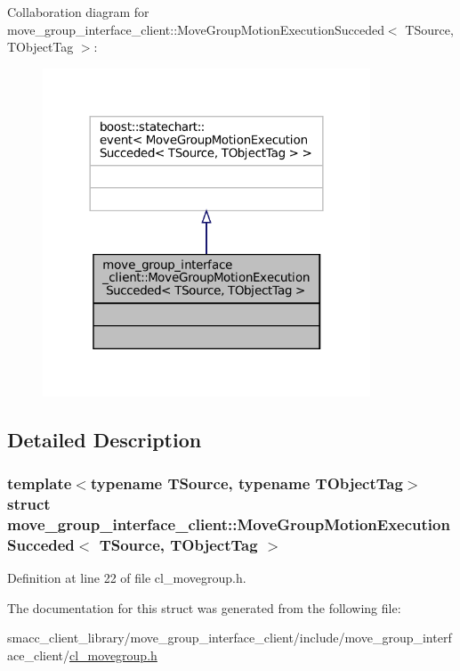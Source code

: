 Collaboration diagram for move\+\_\+group\+\_\+interface\+\_\+client\+:\+:Move\+Group\+Motion\+Execution\+Succeded$<$ T\+Source, T\+Object\+Tag $>$\+:
\nopagebreak
\begin{figure}[H]
\begin{center}
\leavevmode
\includegraphics[width=276pt]{structmove__group__interface__client_1_1MoveGroupMotionExecutionSucceded__coll__graph}
\end{center}
\end{figure}


\subsection{Detailed Description}
\subsubsection*{template$<$typename T\+Source, typename T\+Object\+Tag$>$\newline
struct move\+\_\+group\+\_\+interface\+\_\+client\+::\+Move\+Group\+Motion\+Execution\+Succeded$<$ T\+Source, T\+Object\+Tag $>$}



Definition at line 22 of file cl\+\_\+movegroup.\+h.



The documentation for this struct was generated from the following file\+:\begin{DoxyCompactItemize}
\item 
smacc\+\_\+client\+\_\+library/move\+\_\+group\+\_\+interface\+\_\+client/include/move\+\_\+group\+\_\+interface\+\_\+client/\hyperlink{cl__movegroup_8h}{cl\+\_\+movegroup.\+h}\end{DoxyCompactItemize}
